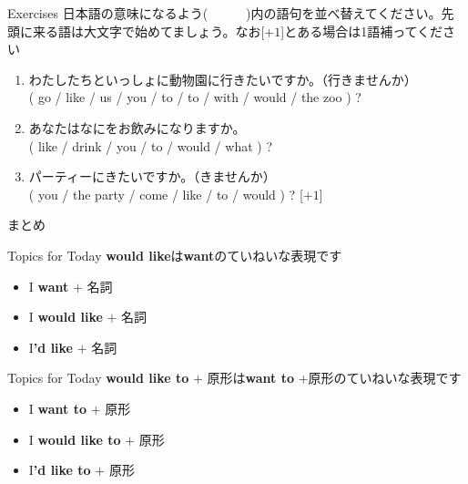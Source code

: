 \documentclass[aspectratio=169,xcolor={dvipsnames,table}]{beamer}
\begin{document}
\begin{frame}[plain]{Exercises}
日本語の意味になるよう(~~~~~~)内の語句を並べ替えてください。先頭に来る語は大文字で始めてましょう。なお[$+1$]とある場合は1語補ってください

 \begin{enumerate}
  \item わたしたちといっしょに動物園に行きたいですか。（行きませんか）\\
( go / like / us / you / to / to / with / would / the zoo ) ?\\
  \item あなたはなにをお飲みになりますか。\\
( like / drink / you / to / would / what ) ?\\
  \item パーティーにきたいですか。（きませんか）\\
( you / the party / come / like / to / would ) ? [$+1$]\\
\end{enumerate}
\hfill{\scriptsize {}}

\end{frame}
\begin{frame}[plain]{まとめ}
 \begin{block}{Topics for Today}\small
\textbf{would like}は\textbf{want}のていねいな表現です
\begin{itemize}[square]\small
 \item I \textbf{want} $+$ 名詞
 \item I \textbf{would like} $+$ 名詞
 \item I\textbf{'d like} $+$ 名詞
       \end{itemize}
\end{block}

\begin{block}{Topics for Today}\small
\textbf{would like to} $+$ 原形は\textbf{want to} $+$原形のていねいな表現です
\begin{itemize}[square]\small
 \item I \textbf{want to} $+$ 原形
 \item I \textbf{would like to} $+$ 原形
 \item I\textbf{'d like to} $+$ 原形
       \end{itemize}
\end{block}
\end{frame}
\end{document}
